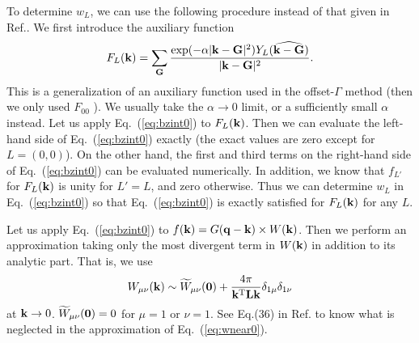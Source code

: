 \documentclass[a4paper,10pt,fleqn]{article}
\newcommand{\bfzero}{{\bf 0}}
\newcommand{\bfq}{{\bf q}}
\newcommand{\bfk}{{\bf k}}
\newcommand{\bfG}{{\bf G}}
\newcommand{\req}[1]{\mbox{Eq.~(\ref{#1})}}
\begin{document}
To determine $w_L$, we can use the following procedure instead of that given 
in Ref.\cite{freysoldt_dielectric_2007}.
We first introduce the auxiliary function  
\begin{eqnarray}
F_L(\bfk) =\sum_{\bfG} \frac{\exp(- \alpha
 |\bfk-\bfG|^2)Y_L(\widehat{\bfk-\bfG})}{|\bfk-\bfG|^2}.
\end{eqnarray}
This is a generalization of an auxiliary function used in the 
offset-$\Gamma$ method (then we only used $F_{00}$ \cite{kotani_quasiparticle_2007}).
We usually take the $\alpha \to 0$ limit, or a sufficiently small $\alpha$ instead.
Let us apply \req{eq:bzint0} to $F_L(\bfk)$.
Then we can evaluate the left-hand side of \req{eq:bzint0}
exactly (the exact values are zero except for $L=(0,0)$). 
On the other hand, the first and 
third terms on the right-hand side of \req{eq:bzint0}
can be evaluated numerically.
In addition, we know that $f_{L'}$ for $F_L(\bfk)$ is unity for $L'=L$,
and zero otherwise.
Thus we can determine $w_L$ in \req{eq:bzint0}
so that \req{eq:bzint0} is exactly satisfied for $F_L(\bfk)$ for any $L$.


Let us apply \req{eq:bzint0} to $f(\bfk)=G(\bfq-\bfk) \times W(\bfk)$.
Then we perform an approximation taking only the most divergent term 
in $W(\bfk)$ in addition to its analytic part. That is, we use
\begin{eqnarray}
W_{\mu \nu}(\bfk) \sim \widetilde{W}_{\mu \nu}(\bfzero) +
 \frac{4 \pi}{\bfk^{\rm T} {\bf L} \bfk}
 \delta_{1\mu}\delta_{1\nu}
\label{eq:wnear0}
\end{eqnarray}
at $\bfk \to 0$. 
$\widetilde{W}_{\mu \nu}(\bfzero)=0$ for $\mu=1$ or $\nu=1$. 
See Eq.(36) in Ref.\cite{friedrich_efficient_2010} to know what is
neglected in the approximation of \req{eq:wnear0}.
\end{document}

